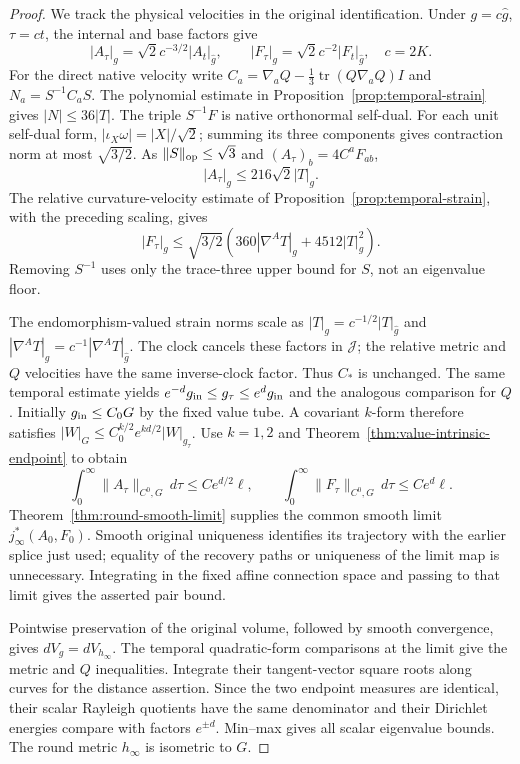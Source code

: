 \documentclass[11pt]{article}
\numberwithin{equation}{section}
\theoremstyle{definition}
\theoremstyle{remark}
\DeclareMathOperator{\tr}{tr}
\begin{document}
\begin{proof}
We track the physical velocities in the original
identification. Under \(g=c\widehat g\), \(\tau=ct\),
the internal and base factors give
\[
 |A_\tau|_g=\sqrt2c^{-3/2}|A_t|_{\widehat g},\qquad
 |F_\tau|_g=\sqrt2c^{-2}|F_t|_{\widehat g},\quad c=2K .
\]
For the direct native velocity write
\(C_a=\nabla_aQ-\tfrac13\tr(Q\nabla_aQ)I\) and
\(N_a=S^{-1}C_aS\). The polynomial estimate in
Proposition~\ref{prop:temporal-strain} gives \(|N|\le36|T|\).
The triple \(S^{-1}F\) is native orthonormal self-dual.
For each unit self-dual form,
\(|\iota_X\omega|=|X|/\sqrt2\); summing its three
components gives contraction norm at most \(\sqrt{3/2}\).
As \(\|S\|_{\rm op}\le\sqrt3\) and
\((A_\tau)_b=4C^aF_{ab}\),
\[
 |A_\tau|_g\le216\sqrt2|T|_g .
\]
The relative curvature-velocity estimate of
Proposition~\ref{prop:temporal-strain}, with the preceding
scaling, gives
\[
 |F_\tau|_g\le\sqrt{3/2}
                     (360|\nabla^AT|_g+4512|T|_g^2).
\]
Removing \(S^{-1}\) uses only the trace-three upper
bound for \(S\), not an eigenvalue floor.

The endomorphism-valued strain norms scale as
\(|T|_g=c^{-1/2}|T|_{\widehat g}\) and
\(|\nabla^AT|_g=c^{-1}|\nabla^AT|_{\widehat g}\).
The clock cancels these factors in \(\mathcal J\);
the relative metric and \(Q\) velocities have the
same inverse-clock factor. Thus \(C_*\) is unchanged.
The same temporal estimate yields
\(e^{-d}g_{\rm in}\le g_\tau\le e^dg_{\rm in}\)
and the analogous comparison for \(Q\).
Initially \(g_{\rm in}\le C_0G\) by the fixed value
tube. A covariant \(k\)-form therefore satisfies
\(|W|_G\le C_0^{k/2}e^{kd/2}|W|_{g_\tau}\).
Use \(k=1,2\) and Theorem~\ref{thm:value-intrinsic-endpoint}
to obtain
\[
 \int_0^\infty\|A_\tau\|_{C^0,G}\,d\tau
                  \le Ce^{d/2}\ell,\qquad
 \int_0^\infty\|F_\tau\|_{C^0,G}\,d\tau
                  \le Ce^d\ell .
\]
Theorem~\ref{thm:round-smooth-limit} supplies the common
smooth limit \(j_\infty^*(A_0,F_0)\). Smooth original
uniqueness identifies its trajectory with the earlier
splice just used; equality of the recovery paths or
uniqueness of the limit map is unnecessary.
Integrating in the fixed affine connection space and
passing to that limit gives the asserted pair bound.

Pointwise preservation of the original volume, followed
by smooth convergence, gives \(dV_g=dV_{h_\infty}\).
The temporal quadratic-form comparisons at the limit
give the metric and \(Q\) inequalities. Integrate
their tangent-vector square roots along curves for
the distance assertion. Since the two endpoint measures
are identical, their scalar Rayleigh quotients have
the same denominator and their Dirichlet energies
compare with factors \(e^{\pm d}\). Min--max gives
all scalar eigenvalue bounds. The round metric
\(h_\infty\) is isometric to \(G\).
\end{proof}
\end{document}
